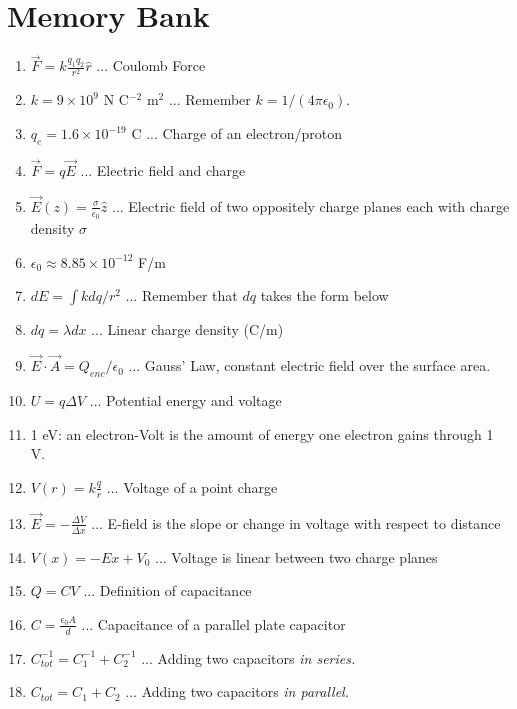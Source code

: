 \documentclass[10pt]{article}
\begin{document}
\maketitle

\section{Memory Bank}

\begin{enumerate}
\item $\vec{F} = k \frac{q_1 q_2}{r^2}\hat{r}$ ... Coulomb Force
\item $k = 9 \times 10^{9}$ N C$^{-2}$ m$^{2}$ ... Remember $k = 1/(4\pi \epsilon_0)$.
\item $q_e = 1.6 \times 10^{-19}$ C ... Charge of an electron/proton
\item $\vec{F} = q \vec{E}$ ... Electric field and charge
\item $\vec{E}(z) = \frac{\sigma}{\epsilon_0}\hat{z}$ ... Electric field of two oppositely charge planes each with charge density $\sigma$
\item $\epsilon_0 \approx 8.85 \times 10^{-12}$ F/m
\item $dE = \int k dq / r^2$ ... Remember that $dq$ takes the form below
\item $dq = \lambda dx$ ... Linear charge density (C/m)
\item $\vec{E} \cdot \vec{A} = Q_{enc}/\epsilon_0$ ... Gauss' Law, constant electric field over the surface area.
\item $U = q\Delta V$ ... Potential energy and voltage
\item 1 eV: an electron-Volt is the amount of energy one electron gains through 1 V.
\item $V(r) = k\frac{q}{r}$ ... Voltage of a point charge
\item $\vec{E} = -\frac{\Delta V}{\Delta x}$ ... E-field is the slope or change in voltage with respect to distance
\item $V(x) = -E x + V_0$ ... Voltage is linear between two charge planes
\item $Q = CV$ ... Definition of capacitance
\item $C = \frac{\epsilon_0 A}{d}$ ... Capacitance of a parallel plate capacitor
\item $C_{tot}^{-1} = C_1^{-1} + C_2^{-1}$ ... Adding two capacitors \textit{in series.}
\item $C_{tot} = C_1 + C_2$ ... Adding two capacitors \textit{in parallel.}

\end{enumerate}
\end{document}
